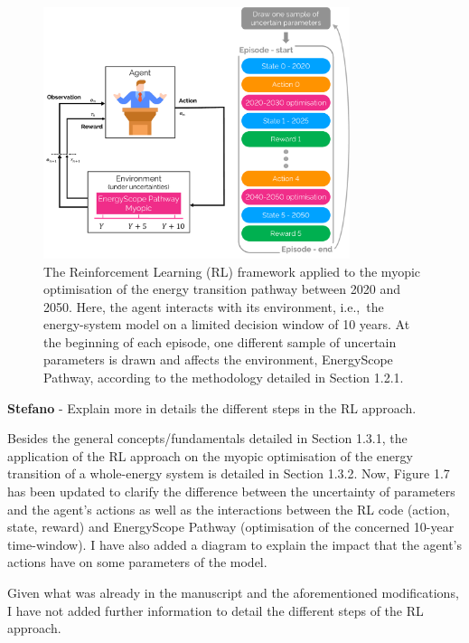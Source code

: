 \documentclass[12pt,a4paper]{article}
\def\ie{i.e.,\ }
\begin{document}
\begin{figure}[!htbp]
\centering
\includegraphics[width=0.8\textwidth]{Schematics_RL.pdf}
\caption{The Reinforcement Learning (RL) framework applied to the myopic optimisation of the energy transition pathway between 2020 and 2050. Here, the agent interacts with its environment, \ie the energy-system model on a limited decision window of 10 years. At the beginning of each episode, one different sample of uncertain parameters is drawn and affects the environment, EnergyScope Pathway, according to the methodology detailed in Section 1.2.1.}
\label{fig:Schematics_RL}
\end{figure}

\begin{mdframed}[style=comment] %
{\color{orange} \textbf{Stefano}} - Explain more in details the different steps in the RL approach.
\end{mdframed}

\noindent Besides the general concepts/fundamentals detailed in Section 1.3.1, the application of the RL approach on the myopic optimisation of the energy transition of a whole-energy system is detailed in Section 1.3.2. Now, Figure 1.7 has been updated to clarify the difference between the uncertainty of parameters and the agent's actions as well as the interactions between the RL code (action, state, reward) and EnergyScope Pathway (optimisation of the concerned 10-year time-window). I have also added a diagram to explain the impact that the agent's actions have on some parameters of the model. 

Given what was already in the manuscript and the aforementioned modifications, I have not added further information to detail the different steps of the RL approach.
\end{document}
